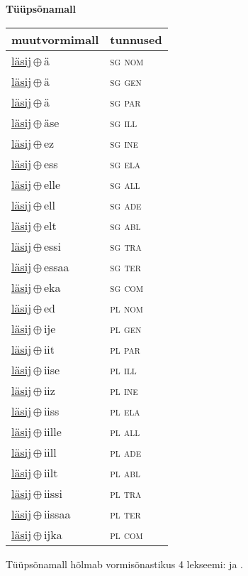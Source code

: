

\vspace{3.5em}
\noindent \begin{minipage}{\textwidth}
\noindent \textbf{Tüüpsõnamall \,}\\

\begin{sideways}
\begin{tabular}{l l}
muutvormimall & tunnused \\
\hline
\underline{läsij}\,$\oplus$\,ä & \textsc{ sg nom } \\
\underline{läsij}\,$\oplus$\,ä & \textsc{ sg gen } \\
\underline{läsij}\,$\oplus$\,ä & \textsc{ sg par } \\
\underline{läsij}\,$\oplus$\,äse & \textsc{ sg ill } \\
\underline{läsij}\,$\oplus$\,ez & \textsc{ sg ine } \\
\underline{läsij}\,$\oplus$\,ess & \textsc{ sg ela } \\
\underline{läsij}\,$\oplus$\,elle & \textsc{ sg all } \\
\underline{läsij}\,$\oplus$\,ell & \textsc{ sg ade } \\
\underline{läsij}\,$\oplus$\,elt & \textsc{ sg abl } \\
\underline{läsij}\,$\oplus$\,essi & \textsc{ sg tra } \\
\underline{läsij}\,$\oplus$\,essaa & \textsc{ sg ter } \\
\underline{läsij}\,$\oplus$\,eka & \textsc{ sg com } \\
\underline{läsij}\,$\oplus$\,ed & \textsc{ pl nom } \\
\underline{läsij}\,$\oplus$\,ije & \textsc{ pl gen } \\
\underline{läsij}\,$\oplus$\,iit & \textsc{ pl par } \\
\underline{läsij}\,$\oplus$\,iise & \textsc{ pl ill } \\
\underline{läsij}\,$\oplus$\,iiz & \textsc{ pl ine } \\
\underline{läsij}\,$\oplus$\,iiss & \textsc{ pl ela } \\
\underline{läsij}\,$\oplus$\,iille & \textsc{ pl all } \\
\underline{läsij}\,$\oplus$\,iill & \textsc{ pl ade } \\
\underline{läsij}\,$\oplus$\,iilt & \textsc{ pl abl } \\
\underline{läsij}\,$\oplus$\,iissi & \textsc{ pl tra } \\
\underline{läsij}\,$\oplus$\,iissaa & \textsc{ pl ter } \\
\underline{läsij}\,$\oplus$\,ijka & \textsc{ pl com } \\
\end{tabular}
\end{sideways}
\label{tab:tüüpsõnamall-läsijä}

\end{minipage}

 
\vspace{1em}
\noindent Tüüpsõnamall  hõlmab vormisõnastikus 4 lekseemi:  ja .
